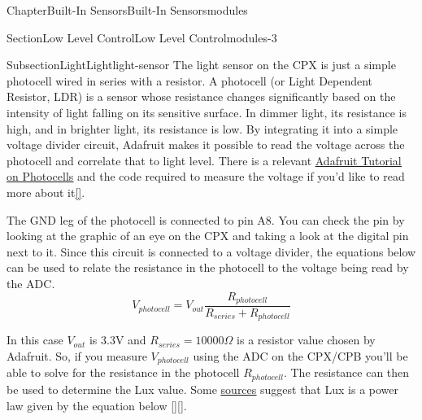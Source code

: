 \documentclass[oneside,10pt,]{book}
\newcommand{\xreffont}{\relax}
\newcommand{\linkhilite}[1]{\underline{#1}}
\numberwithin{equation}{section}
\begin{document}
\begin{chapterptx}{Chapter}{Built-In Sensors}{}{Built-In Sensors}{}{}{modules}
\begin{introduction}{}
\end{introduction}%
%
%
\typeout{************************************************}
\typeout{************************************************}
%
\begin{sectionptx}{Section}{Low Level Control}{}{Low Level Control}{}{}{modules-3}
%
%
\typeout{************************************************}
\typeout{************************************************}
%
\begin{subsectionptx}{Subsection}{Light}{}{Light}{}{}{light-sensor}
The light sensor on the CPX is just a simple photocell wired in series with a resistor. A photocell (or Light Dependent Resistor, LDR) is a sensor whose resistance changes significantly based on the intensity of light falling on its sensitive surface. In dimmer light, its resistance is high, and in brighter light, its resistance is low. By integrating it into a simple voltage divider circuit, Adafruit makes it possible to read the voltage across the photocell and correlate that to light level. There is a relevant \href{https://learn.adafruit.com/photocells/circuitpython}{\linkhilite{Adafruit Tutorial on Photocells}} and the code required to measure the voltage if you'd like to read more about it\hyperlink{Adafruit}{\linkhilite{[{\xreffont 32}]}}.%
\par
The GND leg of the photocell is connected to pin A8. You can check the pin by looking at the graphic of an eye on the CPX and taking a look at the digital pin next to it. Since this circuit is connected to a voltage divider, the equations below can be used to relate the resistance in the photocell to the voltage being read by the ADC.%
\begin{equation}
V_{photocell} = V_{out}\frac{R_{photocell}}{R_{series}+R_{photocell}}\label{light-sensor-3-1}
\end{equation}
%
\par
In this case \(V_{out}\) is 3.3V and \(R_{series}=10000 \Omega\) is a resistor value chosen by Adafruit.  So, if you measure \(V_{photocell}\) using the ADC on the CPX\slash{}CPB you'll be able to solve for the resistance in the photocell \(R_{photocell}\). The resistance can then be used to determine the Lux value. Some \href{https://www.researchgate.net/publication/375038565_Measuring_the_Voltage_Current_and_Resistance_of_the_LDR_Sensor_through_the_Arduino_UNO}{\linkhilite{sources}} suggest that Lux is a power law given by the equation below \hyperlink{b_photocell}{\linkhilite{[{\xreffont 48}]}}\hyperlink{lux}{\linkhilite{[{\xreffont 61}]}}.%

\end{subsectionptx}
\end{sectionptx}
\end{chapterptx}
\end{document}
